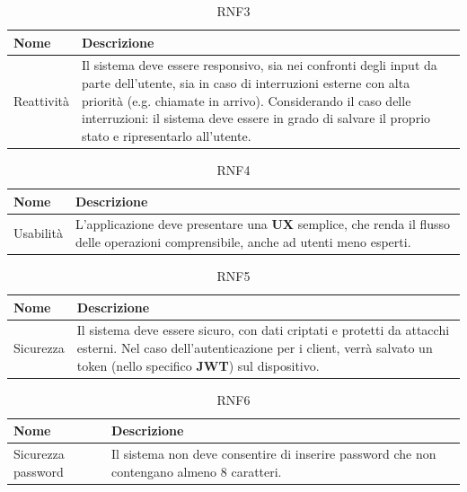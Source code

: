 \documentclass{natourDoc}
\begin{document}
\begin{table}[H]
	\centering
	\begin{tabular}{ |p{5cm}|p{10.3cm}| }
		\hline
		\rowcolor{PineGreen!70}
		\textbf{Nome} & \textbf{Descrizione}                                                                                             \\
		\hline
		Reattività    & Il sistema deve essere responsivo, sia nei confronti degli input da parte dell'utente, sia
		in caso di interruzioni esterne con alta priorità (e.g. chiamate in arrivo).
		Considerando il caso delle interruzioni: il sistema deve essere in grado di salvare il proprio stato e ripresentarlo all'utente. \\
		\hline
	\end{tabular}
	\caption{RNF3}
\end{table}

\begin{table}[H]
	\centering
	\begin{tabular}{ |p{5cm}|p{10.3cm}| }
		\hline
		\rowcolor{PineGreen!70}
		\textbf{Nome} & \textbf{Descrizione}                                                                              \\
		\hline
		Usabilità     & L'applicazione deve presentare una \textbf{UX} semplice, che renda il flusso delle operazioni
		comprensibile, anche ad utenti meno esperti.                                                                      \\
		\hline
	\end{tabular}
	\caption{RNF4}
\end{table}

\begin{table}[H]
	\centering
	\begin{tabular}{ |p{5cm}|p{10.3cm}| }
		\hline
		\rowcolor{PineGreen!70}
		\textbf{Nome} & \textbf{Descrizione}                                                                              \\
		\hline
		Sicurezza     & Il sistema deve essere sicuro, con dati criptati e protetti da attacchi esterni.
		Nel caso dell'autenticazione per i client, verrà salvato un token (nello specifico \textbf{JWT}) sul dispositivo. \\
		\hline
	\end{tabular}
	\caption{RNF5}
\end{table}

\begin{table}[H]
	\centering
	\begin{tabular}{ |p{5cm}|p{10.3cm}| }
		\hline
		\rowcolor{PineGreen!70}
		\textbf{Nome}      & \textbf{Descrizione}                                            \\
		\hline
		Sicurezza password & Il sistema non deve consentire di inserire password che non contengano
		almeno 8 caratteri.                                                                  \\
		\hline
	\end{tabular}
	\caption{RNF6}
\end{table}
\end{document}
